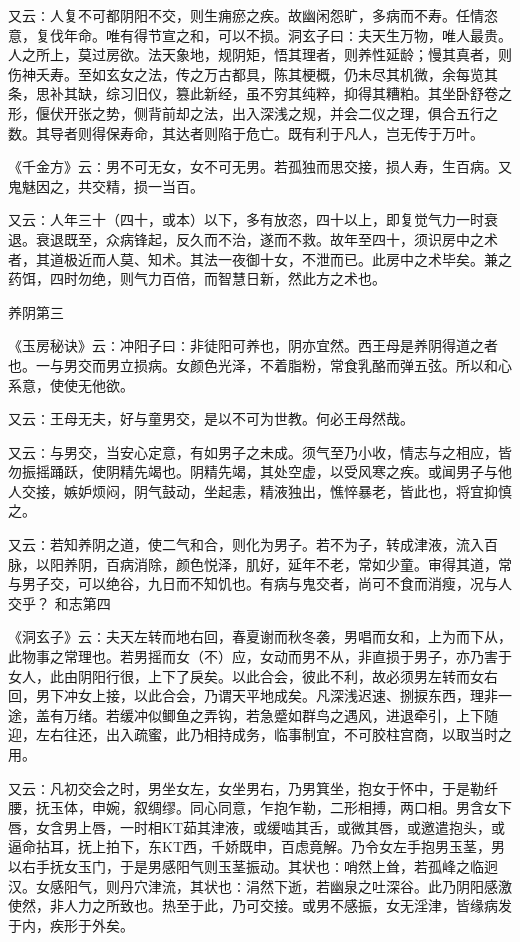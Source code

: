 \documentclass[a4paper,12pt,UTF8,twoside]{ctexbook}
\begin{document}
又云∶人复不可都阴阳不交，则生痈瘀之疾。故幽闲怨旷，多病而不寿。任情恣意，复伐年命。唯有得节宣之和，可以不损。洞玄子曰∶夫天生万物，唯人最贵。人之所上，莫过房欲。法天象地，规阴矩，悟其理者，则养性延龄；慢其真者，则伤神夭寿。至如玄女之法，传之万古都具，陈其梗概，仍未尽其机微，余每览其条，思补其缺，综习旧仪，篡此新经，虽不穷其纯粹，抑得其糟粕。其坐卧舒卷之形，偃伏开张之势，侧背前却之法，出入深浅之规，并会二仪之理，俱合五行之数。其导者则得保寿命，其达者则陷于危亡。既有利于凡人，岂无传于万叶。

《千金方》云∶男不可无女，女不可无男。若孤独而思交接，损人寿，生百病。又鬼魅因之，共交精，损一当百。

又云∶人年三十（四十，或本）以下，多有放恣，四十以上，即复觉气力一时衰退。衰退既至，众病锋起，反久而不治，遂而不救。故年至四十，须识房中之术者，其道极近而人莫、知术。其法一夜御十女，不泄而已。此房中之术毕矣。兼之药饵，四时勿绝，则气力百倍，而智慧日新，然此方之术也。

养阴第三

《玉房秘诀》云∶冲阳子曰∶非徒阳可养也，阴亦宜然。西王母是养阴得道之者也。一与男交而男立损病。女颜色光泽，不着脂粉，常食乳酪而弹五弦。所以和心系意，使使无他欲。

又云∶王母无夫，好与童男交，是以不可为世教。何必王母然哉。

又云∶与男交，当安心定意，有如男子之未成。须气至乃小收，情志与之相应，皆勿振摇踊跃，使阴精先竭也。阴精先竭，其处空虚，以受风寒之疾。或闻男子与他人交接，嫉妒烦闷，阴气鼓动，坐起恚，精液独出，憔悴暴老，皆此也，将宜抑慎之。

又云∶若知养阴之道，使二气和合，则化为男子。若不为子，转成津液，流入百脉，以阳养阴，百病消除，颜色悦泽，肌好，延年不老，常如少童。审得其道，常与男子交，可以绝谷，九日而不知饥也。有病与鬼交者，尚可不食而消瘦，况与人交乎？
和志第四

《洞玄子》云∶夫天左转而地右回，春夏谢而秋冬袭，男唱而女和，上为而下从，此物事之常理也。若男摇而女（不）应，女动而男不从，非直损于男子，亦乃害于女人，此由阴阳行很，上下了戾矣。以此合会，彼此不利，故必须男左转而女右回，男下冲女上接，以此合会，乃谓天平地成矣。凡深浅迟速、捌捩东西，理非一途，盖有万绪。若缓冲似鲫鱼之弄钩，若急蹙如群鸟之遇风，进退牵引，上下随迎，左右往还，出入疏蜜，此乃相持成务，临事制宜，不可胶柱宫商，以取当时之用。

又云∶凡初交会之时，男坐女左，女坐男右，乃男箕坐，抱女于怀中，于是勒纤腰，抚玉体，申婉，叙绸缪。同心同意，乍抱乍勒，二形相搏，两口相。男含女下唇，女含男上唇，一时相KT茹其津液，或缓啮其舌，或微其唇，或邀遣抱头，或逼命拈耳，抚上拍下，东KT西，千娇既申，百虑竟解。乃令女左手抱男玉茎，男以右手抚女玉门，于是男感阳气则玉茎振动。其状也∶哨然上耸，若孤峰之临迥汉。女感阳气，则丹穴津流，其状也∶涓然下逝，若幽泉之吐深谷。此乃阴阳感激使然，非人力之所致也。热至于此，乃可交接。或男不感振，女无淫津，皆缘病发于内，疾形于外矣。
\end{document}
